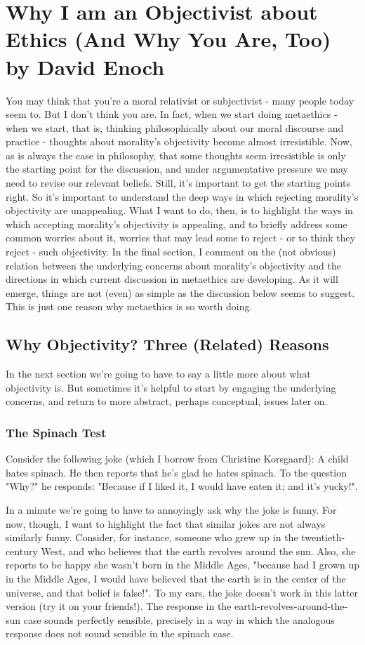 \chapter{Why I am an Objectivist about Ethics (And Why You Are, Too) by David Enoch }\autocite{Enoch1}

You may think that you're a moral relativist or subjectivist - many people today seem to. 
But I don't think you are. In fact, when we start doing metaethics - when we start, that 
is, thinking philosophically about our moral discourse and practice - thoughts about 
morality's objectivity become almost irresistible. Now, as is always the case in 
philosophy, that some thoughts seem irresistible is only the starting point for the 
discussion, and under argumentative pressure we may need to revise our relevant 
beliefs. Still, it's important to get the starting points right. So it's important to 
understand the deep ways in which rejecting morality's objectivity are unappealing. 
What I want to do, then, is to highlight the ways in which accepting morality's objectivity 
is appealing, and to briefly address some common worries about it, worries that may 
lead some to reject - or to think they reject - such objectivity. In the final section, I 
comment on the (not obvious) relation between the underlying concerns about 
morality's objectivity and the directions in which current discussion in metaethics are 
developing. As it will emerge, things are not (even) as simple as the discussion below 
seems to suggest. This is just one reason why metaethics is so worth doing. 
 
 \section{Why Objectivity? Three (Related) Reasons} 
In the next section we're going to have to say a little more about what objectivity is. But 
sometimes it's helpful to start by engaging the underlying concerns, and return to more 
abstract, perhaps conceptual, issues later on.
\subsection{The Spinach Test} 
Consider the following joke (which I borrow from Christine Korsgaard): A child hates 
spinach. He then reports that he's glad he hates spinach. To the question "Why?" he 
responds: "Because if I liked it, I would have eaten it; and it's yucky!". 

In a minute we're going to have to annoyingly ask why the joke is funny. For 
now, though, I want to highlight the fact that similar jokes are not always similarly 
funny. Consider, for instance, someone who grew up in the twentieth-century West, and 
who believes that the earth revolves around the sun. Also, she reports to be happy she 
wasn't born in the Middle Ages, "because had I grown up in the Middle Ages, I would 
have believed that the earth is in the center of the universe, and that belief is false!".  
To my ears, the joke doesn't work in this latter version (try it on your friends!). The 
response in the earth-revolves-around-the-sun case sounds perfectly sensible, precisely 
in a way in which the analogous response does not sound sensible in the spinach case. 

